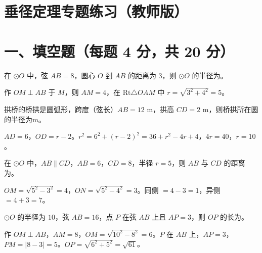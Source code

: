 \documentclass{exam-zh}
\begin{document}
\section*{垂径定理专题练习（教师版）}

\section*{一、填空题（每题 4 分，共 20 分）}


\begin{question}[points=4]
  在 $\odot O$ 中，弦 $AB = 8$，圆心 $O$ 到 $AB$ 的距离为 $3$，则 $\odot O$ 的半径为\fillin。
  \fillin
  \paren[5]
  \begin{solutionblock}
    作 $OM \perp AB$ 于 $M$，则 $AM = 4$，在 $\mathrm{Rt}\triangle OAM$ 中 $r = \sqrt{3^2+4^2} = 5$。
  \end{solutionblock}
\end{question}



\begin{question}[points=4]
  拱桥的桥拱是圆弧形，跨度（弦长）$AB = 12$ m，拱高 $CD = 2$ m，则桥拱所在圆的半径为\fillin m。
  \fillin
  \paren[10]
  \begin{solutionblock}
    $AD = 6$，$OD = r - 2$。$r^2 = 6^2 + (r-2)^2 = 36 + r^2 - 4r + 4$，$4r = 40$，$r = 10$。
  \end{solutionblock}
\end{question}



\begin{question}[points=4]
  在 $\odot O$ 中，$AB \parallel CD$，$AB = 6$，$CD = 8$，半径 $r = 5$，则 $AB$ 与 $CD$ 的距离为\fillin。
  \fillin
  \paren[1 或 7]
  \begin{solutionblock}
    $OM = \sqrt{5^2-3^2} = 4$，$ON = \sqrt{5^2-4^2} = 3$。同侧 $= 4-3 = 1$，异侧 $= 4+3 = 7$。
  \end{solutionblock}
\end{question}



\begin{question}[points=4]
  $\odot O$ 的半径为 $10$，弦 $AB = 16$，点 $P$ 在弦 $AB$ 上且 $AP = 3$，则 $OP$ 的长为\fillin。
  \fillin
  \paren[$\sqrt{61}$]
  \begin{solutionblock}
    作 $OM \perp AB$，$AM = 8$，$OM = \sqrt{10^2-8^2} = 6$。$P$ 在 $AB$ 上，$AP = 3$，$PM = |8-3| = 5$。$OP = \sqrt{6^2+5^2} = \sqrt{61}$。
  \end{solutionblock}
\end{question}
\end{document}
